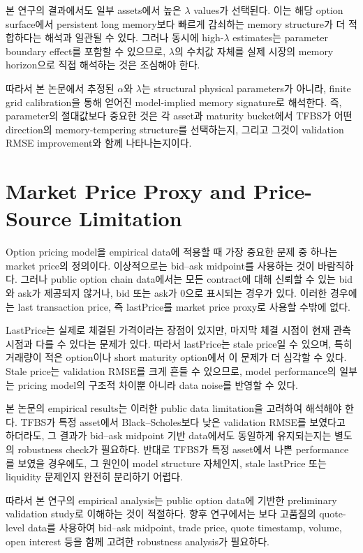 \documentclass[11pt,a4paper]{report}
\begin{document}
본 연구의 결과에서도 일부 assets에서 높은 $\lambda$ values가 선택된다. 이는 해당 option surface에서 persistent long memory보다 빠르게 감쇠하는 memory structure가 더 적합하다는 해석과 일관될 수 있다. 그러나 동시에 high-\(\lambda\) estimates는 parameter boundary effect를 포함할 수 있으므로, $\lambda$의 수치값 자체를 실제 시장의 memory horizon으로 직접 해석하는 것은 조심해야 한다.

따라서 본 논문에서 추정된 $\alpha$와 $\lambda$는 structural physical parameters가 아니라, finite grid calibration을 통해 얻어진 model-implied memory signature로 해석한다. 즉, parameter의 절대값보다 중요한 것은 각 asset과 maturity bucket에서 TFBS가 어떤 direction의 memory-tempering structure를 선택하는지, 그리고 그것이 validation RMSE improvement와 함께 나타나는지이다.

\section{Market Price Proxy and Price-Source Limitation}

Option pricing model을 empirical data에 적용할 때 가장 중요한 문제 중 하나는 market price의 정의이다. 이상적으로는 bid--ask midpoint를 사용하는 것이 바람직하다. 그러나 public option chain data에서는 모든 contract에 대해 신뢰할 수 있는 bid와 ask가 제공되지 않거나, bid 또는 ask가 0으로 표시되는 경우가 있다. 이러한 경우에는 last transaction price, 즉 lastPrice를 market price proxy로 사용할 수밖에 없다.

LastPrice는 실제로 체결된 가격이라는 장점이 있지만, 마지막 체결 시점이 현재 관측 시점과 다를 수 있다는 문제가 있다. 따라서 lastPrice는 stale price일 수 있으며, 특히 거래량이 적은 option이나 short maturity option에서 이 문제가 더 심각할 수 있다. Stale price는 validation RMSE를 크게 흔들 수 있으므로, model performance의 일부는 pricing model의 구조적 차이뿐 아니라 data noise를 반영할 수 있다.

본 논문의 empirical results는 이러한 public data limitation을 고려하여 해석해야 한다. TFBS가 특정 asset에서 Black--Scholes보다 낮은 validation RMSE를 보였다고 하더라도, 그 결과가 bid--ask midpoint 기반 data에서도 동일하게 유지되는지는 별도의 robustness check가 필요하다. 반대로 TFBS가 특정 asset에서 나쁜 performance를 보였을 경우에도, 그 원인이 model structure 자체인지, stale lastPrice 또는 liquidity 문제인지 완전히 분리하기 어렵다.

따라서 본 연구의 empirical analysis는 public option data에 기반한 preliminary validation study로 이해하는 것이 적절하다. 향후 연구에서는 보다 고품질의 quote-level data를 사용하여 bid--ask midpoint, trade price, quote timestamp, volume, open interest 등을 함께 고려한 robustness analysis가 필요하다.
\end{document}
